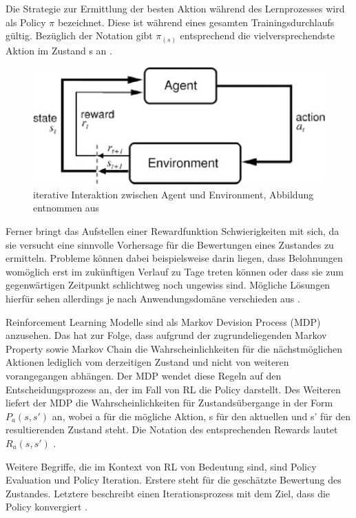 \documentclass[12pt,a4paper]{article}
\begin{document}
Die Strategie zur Ermittlung der besten Aktion während des Lernprozesses wird als Policy $\pi$ bezeichnet. Diese ist während eines gesamten Trainingsdurchlaufs gültig. Bezüglich der Notation gibt $\pi_{(s)}$ entsprechend die vielversprechendste Aktion im Zustand s an \cite[S. 16]{Sewak2019}.

\begin{figure}
\centering
\includegraphics{pics/rl_agent_loop.png}	\caption{iterative Interaktion zwischen Agent und Environment, Abbildung entnommen aus \cite[S. 2]{Sewak2019}}
\label{fig:rl_agent_loop}
\end{figure}

Ferner bringt das Aufstellen einer Rewardfunktion Schwierigkeiten mit sich, da sie versucht eine sinnvolle Vorhersage für die Bewertungen eines Zustandes zu ermitteln. Probleme können dabei beispielsweise darin liegen, dass Belohnungen womöglich erst im zukünftigen Verlauf zu Tage treten können oder dass sie zum gegenwärtigen Zeitpunkt schlichtweg noch ungewiss sind. Mögliche Lösungen hierfür sehen allerdings je nach Anwendungsdomäne verschieden aus \cite[S. 4-7]{Sewak2019}.

Reinforcement Learning Modelle sind als \glqq{}Markov Devision Process\grqq{} (MDP) anzusehen. Das hat zur Folge, dass aufgrund der zugrundeliegenden \glqq{}Markov Property\grqq{} sowie \glqq{}Markov Chain\grqq{} die Wahrscheinlichkeiten für die nächstmöglichen Aktionen lediglich vom derzeitigen Zustand und nicht von weiteren vorangegangen abhängen. Der MDP wendet diese Regeln auf den Entscheidungsprozess an, der im Fall von RL die Policy darstellt. Des Weiteren liefert der MDP die Wahrscheinlichkeiten für Zustandsübergange in der Form $P_{a}(s, s')$ an, wobei a für die mögliche Aktion, s für den aktuellen und s' für den resultierenden Zustand steht. Die Notation des entsprechenden Rewards lautet $R_{a}(s, s')$ \cite[S. 19f.]{Sewak2019}.

Weitere Begriffe, die im Kontext von RL von Bedeutung sind, sind \glqq{}Policy Evaluation\grqq{} und \glqq{}Policy Iteration\grqq{}. Erstere steht für die geschätzte Bewertung des Zustandes. Letztere beschreibt einen Iterationsprozess mit dem Ziel, dass die Policy konvergiert \cite[S. 27]{Sewak2019}.
\end{document}

